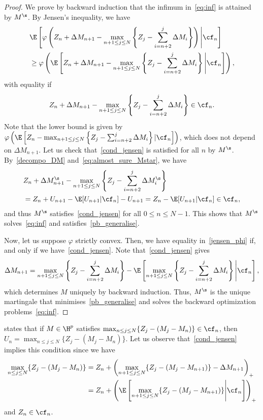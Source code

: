 \begin{proof}
We prove by backward induction that the infimum in~\eqref{eq:inf} is attained by $M^\s$. 
By Jensen's inequality, we have
\begin{align}\label{jensen_phi}
&\E\left[ \varphi \left(Z_{n} + \Delta M_{n+1}  - \max_{n + 1\le j \le N} \left\{ Z_{j} - \sum_{i=n+2}^{j} \Delta M_i \right\} \right) \Bigg| \cf_{n} \right] \\
&\ge \varphi \left( \E\left[ Z_{n} + \Delta M_{n+1}  - \max_{n + 1\le j \le N} \left\{ Z_{j} - \sum_{i=n+2}^{j} \Delta M_i \right\} \Bigg| \cf_{n} \right]\right), \notag
\end{align}
 with equality if \begin{equation}\label{cond_jensen}
Z_{n} + \Delta M_{n+1}  - \max_{n + 1\le j \le N} \left\{ Z_{j} - \sum_{i=n+2}^{j} \Delta M_i \right\} \in \cf_{n}.\end{equation} Note that the lower bound is given by $\varphi \left( \E\left[ Z_{n} - \max_{n + 1\le j \le N} \left\{ Z_{j} - \sum_{i=n+2}^{j} \Delta M_i \right\} | \cf_{n} \right]\right)$, which does not depend on $\Delta M_{n+1}$. Let us check that~\eqref{cond_jensen} is satisfied for all $n$ by $M^\s$. By~\eqref{decompo_DM} and~\eqref{eq:almost_sure_Mstar}, we have
\begin{align*}
  &   Z_{n} + \Delta M^\s_{n+1}  - \max_{n + 1\le j \le N} \left\{ Z_{j} - \sum_{i=n+2}^{j} \Delta M^\s_i \right\} \\
  &=  Z_{n} +U_{n+1}- \E[U_{n+1}|\cf_{n}]-U_{n+1}=Z_{n}- \E[U_{n+1}|\cf_{n}] \in \cf_{n},
\end{align*}
  and thus $M^\s$ satisfies~\eqref{cond_jensen} for all $0\le n \le N-1$. This shows that $M^\s$ solves~\eqref{eq:inf} and satisfies~\eqref{pb_generalise}.
  
Now, let us suppose $\varphi$ strictly convex. Then, we have equality in~\eqref{jensen_phi} if, and only if we have~\eqref{cond_jensen}.  Note that~\eqref{cond_jensen} gives $$\Delta M_{n+1} = \max_{n + 1\le j \le N}  \left\{ Z_{j} - \sum_{i=n+2}^{j} \Delta M_i \right\}- \E\left[\max_{n + 1\le j \le N} \left\{ Z_{j} - \sum_{i=n+2}^{j} \Delta M_i \right\} \Bigg|\cf_n \right],$$ which  determines $M$ uniquely by backward induction.  
Thus, $M^\s$ is the unique martingale that minimises~\eqref{pb_generalise} and solves the backward optimization problems~\eqref{eq:inf}. 
\end{proof}

\begin{remark}
  \cite[Theorem 4.6]{schoen12-1} states that if $M\in \H^p$ satisfies $\max_{n\le j \le N}  \{Z_j -(M_j-M_n) \} \in \cf_n$, then $U_n=\max_{n\le j \le N}  \{Z_j -(M_j-M_n) \} $.
Let us observe that~\eqref{cond_jensen} implies this condition since we have
\begin{align*}
  \max_{n\le j \le N}  \{Z_j -(M_j-M_n) \}&= Z_n+ \left( \max_{n+1 \le j \le N}  \{Z_j -(M_j-M_{n+1}) \} -\Delta M_{n+1}\right)_+\\
  &=Z_n+\left( \E \left[ \max_{n+1 \le j \le N}  \{Z_j -(M_j-M_{n+1}) \} \Bigg| \cf_n\right]\right)_+
\end{align*} and $Z_n\in \cf_n$.
\end{remark}

